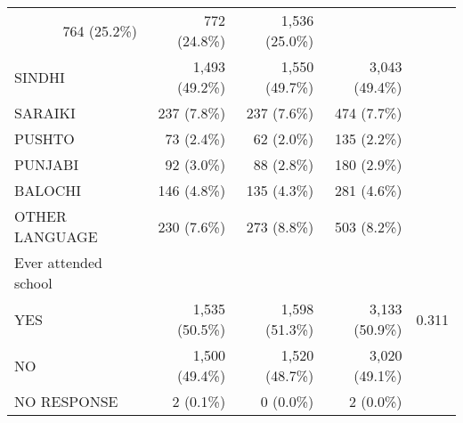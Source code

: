 \documentclass{article}
\begin{document}
\begin{table}[!h]
\begin{tabular}{lllll}
  \multicolumn{1}{r}{764 (25.2\%)} &
  \multicolumn{1}{r}{772 (24.8\%)} &
  \multicolumn{1}{r}{1,536 (25.0\%)} &
  \multicolumn{1}{r}{} \\
\multicolumn{1}{l}{\hspace{1em}SINDHI} &
  \multicolumn{1}{r}{1,493 (49.2\%)} &
  \multicolumn{1}{r}{1,550 (49.7\%)} &
  \multicolumn{1}{r}{3,043 (49.4\%)} &
  \multicolumn{1}{r}{} \\
\multicolumn{1}{l}{\hspace{1em}SARAIKI} &
  \multicolumn{1}{r}{237 (7.8\%)} &
  \multicolumn{1}{r}{237 (7.6\%)} &
  \multicolumn{1}{r}{474 (7.7\%)} &
  \multicolumn{1}{r}{} \\
\multicolumn{1}{l}{\hspace{1em}PUSHTO} &
  \multicolumn{1}{r}{73 (2.4\%)} &
  \multicolumn{1}{r}{62 (2.0\%)} &
  \multicolumn{1}{r}{135 (2.2\%)} &
  \multicolumn{1}{r}{} \\
\multicolumn{1}{l}{\hspace{1em}PUNJABI} &
  \multicolumn{1}{r}{92 (3.0\%)} &
  \multicolumn{1}{r}{88 (2.8\%)} &
  \multicolumn{1}{r}{180 (2.9\%)} &
  \multicolumn{1}{r}{} \\
\multicolumn{1}{l}{\hspace{1em}BALOCHI} &
  \multicolumn{1}{r}{146 (4.8\%)} &
  \multicolumn{1}{r}{135 (4.3\%)} &
  \multicolumn{1}{r}{281 (4.6\%)} &
  \multicolumn{1}{r}{} \\
\multicolumn{1}{l}{\hspace{1em}OTHER LANGUAGE} &
  \multicolumn{1}{r}{230 (7.6\%)} &
  \multicolumn{1}{r}{273 (8.8\%)} &
  \multicolumn{1}{r}{503 (8.2\%)} &
  \multicolumn{1}{r}{} \\
\multicolumn{1}{l}{Ever attended school} &
  \multicolumn{1}{r}{} &
  \multicolumn{1}{r}{} &
  \multicolumn{1}{r}{} &
  \multicolumn{1}{r}{} \\
\multicolumn{1}{l}{\hspace{1em}YES} &
  \multicolumn{1}{r}{1,535 (50.5\%)} &
  \multicolumn{1}{r}{1,598 (51.3\%)} &
  \multicolumn{1}{r}{3,133 (50.9\%)} &
  \multicolumn{1}{r}{0.311} \\
\multicolumn{1}{l}{\hspace{1em}NO} &
  \multicolumn{1}{r}{1,500 (49.4\%)} &
  \multicolumn{1}{r}{1,520 (48.7\%)} &
  \multicolumn{1}{r}{3,020 (49.1\%)} &
  \multicolumn{1}{r}{} \\
\multicolumn{1}{l}{\hspace{1em}NO RESPONSE} &
  \multicolumn{1}{r}{2 (0.1\%)} &
  \multicolumn{1}{r}{0 (0.0\%)} &
  \multicolumn{1}{r}{2 (0.0\%)} &

\end{tabular}
\end{table}
\end{document}

